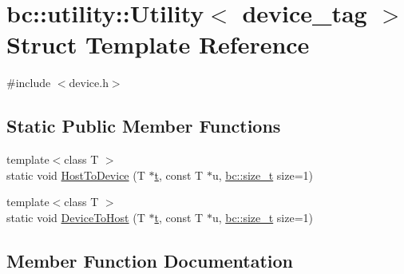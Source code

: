 \hypertarget{structbc_1_1utility_1_1Utility_3_01device__tag_01_4}{}\section{bc\+:\+:utility\+:\+:Utility$<$ device\+\_\+tag $>$ Struct Template Reference}
\label{structbc_1_1utility_1_1Utility_3_01device__tag_01_4}


{\ttfamily \#include $<$device.\+h$>$}

\subsection*{Static Public Member Functions}
\begin{DoxyCompactItemize}
\item 
{\footnotesize template$<$class T $>$ }\\static void \hyperlink{structbc_1_1utility_1_1Utility_3_01device__tag_01_4_a5352c653d9f17045046ec8359f52127a}{Host\+To\+Device} (T $\ast$\hyperlink{expression__operations_8h_aaf23b70530701962855e4abdeea019a2}{t}, const T $\ast$u, \hyperlink{namespacebc_aaf8e3fbf99b04b1b57c4f80c6f55d3c5}{bc\+::size\+\_\+t} size=1)
\item 
{\footnotesize template$<$class T $>$ }\\static void \hyperlink{structbc_1_1utility_1_1Utility_3_01device__tag_01_4_afd7d4340ff72d26a87d872ea73f3bd00}{Device\+To\+Host} (T $\ast$\hyperlink{expression__operations_8h_aaf23b70530701962855e4abdeea019a2}{t}, const T $\ast$u, \hyperlink{namespacebc_aaf8e3fbf99b04b1b57c4f80c6f55d3c5}{bc\+::size\+\_\+t} size=1)
\end{DoxyCompactItemize}


\subsection{Member Function Documentation}
\mbox{\label{structbc_1_1utility_1_1Utility_3_01device__tag_01_4_afd7d4340ff72d26a87d872ea73f3bd00}} 
